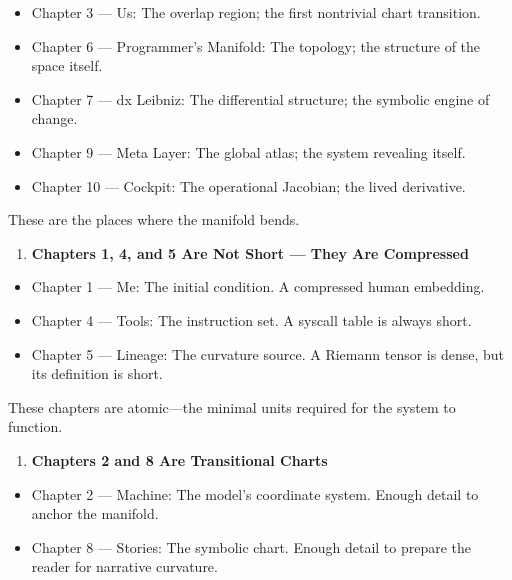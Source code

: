 \documentclass[
]{article}
\providecommand{\tightlist}{%
  \setlength{\itemsep}{0pt}\setlength{\parskip}{0pt}}
\begin{document}
\begin{itemize}
\tightlist
\item
  Chapter 3 --- Us: The overlap region; the first nontrivial chart
  transition.
\item
  Chapter 6 --- Programmer's Manifold: The topology; the structure of
  the space itself.
\item
  Chapter 7 --- dx Leibniz: The differential structure; the symbolic
  engine of change.
\item
  Chapter 9 --- Meta Layer: The global atlas; the system revealing
  itself.
\item
  Chapter 10 --- Cockpit: The operational Jacobian; the lived
  derivative.
\end{itemize}

These are the places where the manifold bends.

\begin{enumerate}
\def\labelenumi{\arabic{enumi}.}
\setcounter{enumi}{1}
\tightlist
\item
  \textbf{Chapters 1, 4, and 5 Are Not Short --- They Are Compressed}
\end{enumerate}

\begin{itemize}
\tightlist
\item
  Chapter 1 --- Me: The initial condition. A compressed human embedding.
\item
  Chapter 4 --- Tools: The instruction set. A syscall table is always
  short.
\item
  Chapter 5 --- Lineage: The curvature source. A Riemann tensor is
  dense, but its definition is short.
\end{itemize}

These chapters are atomic---the minimal units required for the system to
function.

\begin{enumerate}
\def\labelenumi{\arabic{enumi}.}
\setcounter{enumi}{2}
\tightlist
\item
  \textbf{Chapters 2 and 8 Are Transitional Charts}
\end{enumerate}

\begin{itemize}
\tightlist
\item
  Chapter 2 --- Machine: The model's coordinate system. Enough detail to
  anchor the manifold.
\item
  Chapter 8 --- Stories: The symbolic chart. Enough detail to prepare
  the reader for narrative curvature.
\end{itemize}
\end{document}
